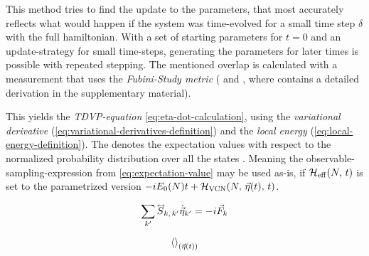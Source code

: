 This method tries to find the update to the parameters, that most accurately reflects what would happen if the system was time-evolved for a small time step $\delta$ with the full hamiltonian.
With a set of starting parameters for $t=0$ and an update-strategy for small time-steps, generating the parameters for later times is possible with repeated stepping.
The mentioned overlap is calculated with a measurement that uses the \emph{Fubini-Study metric} (\cite{variationalClassicalNetworksPaper} and \cite{probabilitySamplingRequirementVCN}, where \cite{probabilitySamplingRequirementVCN} contains a detailed derivation in the supplementary material).

This yields the \emph{TDVP-equation} \autoref{eq:eta-dot-calculation}, using the \emph{variational derivative} (\autoref{eq:variational-derivatives-definition}) and the \emph{local energy} (\autoref{eq:local-energy-definition}).
The \etaExpectationVal{\ast} denotes the expectation values with respect to the normalized probability distribution over all the states  \cite{probabilitySamplingRequirementVCN}.
Meaning the observable-sampling-expression from \autoref{eq:expectation-value} may be used as-is, if ${\mathcal{H}_\text{eff}}^{}({N},\,t)$ is set to the parametrized version $-i E_0(N) t + {\mathcal{H}_\text{VCN}}({N},\,{\vec{\eta}(t)},\,t)$.

\begin{equation}
    \label{eq:eta-dot-calculation}
    \lsum[k'] \matvec{S}_{k,\, k'} \dot{\vec{\eta}}_{k'} = -i \vec{F}_k
\end{equation}

\begin{equation}
    \label{eq:variational-derivatives-definition}
    {\left\langle {}\right\rangle}_{(\vec{\eta}(t))}
\end{equation}

\begin{equation}
    \label{eq:local-energy-definition}
\end{equation}

